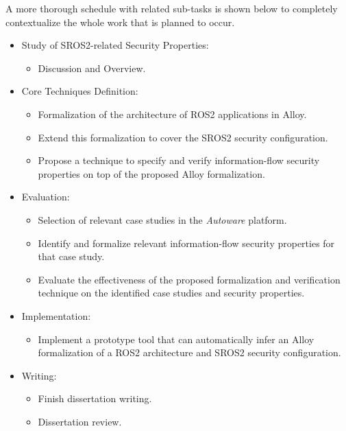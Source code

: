 A more thorough schedule with related sub-tasks is shown below to completely contextualize the whole work that is planned to occur.

\begin{itemize}
\item Study of SROS2-related Security Properties:
    \begin{itemize}
        \item Discussion and Overview.
    \end{itemize}

\item Core Techniques Definition:
    \begin{itemize}
        \item Formalization of the architecture of ROS2 applications in Alloy.
        \item Extend this formalization to cover the SROS2 security configuration.
        \item Propose a technique to specify and verify information-flow security properties on top of the proposed Alloy formalization.
    \end{itemize}

\item Evaluation:
    \begin{itemize}
        \item Selection of relevant case studies in the \textit{Autoware} platform.
        \item Identify and formalize relevant information-flow security properties for that case study.
        \item Evaluate the effectiveness of the proposed formalization and verification technique on the identified case studies and security properties.
    \end{itemize}

\item Implementation:
    \begin{itemize}
        \item Implement a prototype tool that can automatically infer an Alloy formalization of a ROS2 architecture and SROS2 security configuration.
    \end{itemize}

\item Writing:
    \begin{itemize}
        \item Finish dissertation writing.
        \item Dissertation review.
    \end{itemize}
\end{itemize}